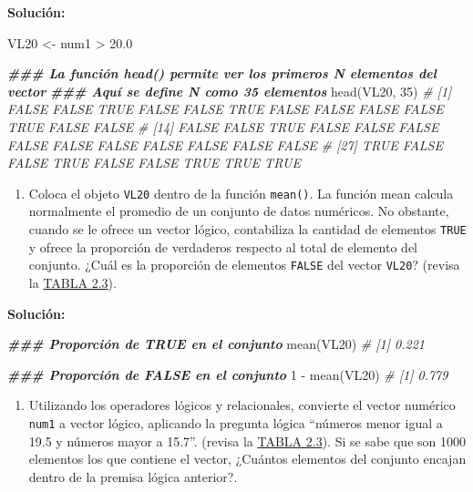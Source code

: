 \documentclass[
]{article}
\newenvironment{Shaded}{\begin{snugshade}}{\end{snugshade}}
\newcommand{\CommentTok}[1]{\textcolor[rgb]{0.56,0.35,0.01}{\textit{#1}}}
\newcommand{\DecValTok}[1]{\textcolor[rgb]{0.00,0.00,0.81}{#1}}
\newcommand{\DocumentationTok}[1]{\textcolor[rgb]{0.56,0.35,0.01}{\textbf{\textit{#1}}}}
\newcommand{\FloatTok}[1]{\textcolor[rgb]{0.00,0.00,0.81}{#1}}
\newcommand{\FunctionTok}[1]{\textcolor[rgb]{0.00,0.00,0.00}{#1}}
\newcommand{\NormalTok}[1]{#1}
\newcommand{\OtherTok}[1]{\textcolor[rgb]{0.56,0.35,0.01}{#1}}
\newcommand{\SpecialCharTok}[1]{\textcolor[rgb]{0.00,0.00,0.00}{#1}}
\providecommand{\tightlist}{%
  \setlength{\itemsep}{0pt}\setlength{\parskip}{0pt}}
\theoremstyle{definition}
\theoremstyle{definition}
\theoremstyle{definition}
\theoremstyle{definition}
\theoremstyle{remark}
\begin{document}
\textbf{Solución:}

\begin{Shaded}
\begin{Highlighting}[]
\NormalTok{VL20 }\OtherTok{\textless{}{-}}\NormalTok{ num1 }\SpecialCharTok{\textgreater{}} \FloatTok{20.0}

\DocumentationTok{\#\#\# La función head() permite ver los primeros N elementos del vector}
\DocumentationTok{\#\#\# Aquí se define N como 35 elementos}
\FunctionTok{head}\NormalTok{(VL20, }\DecValTok{35}\NormalTok{)}
\CommentTok{\#  [1] FALSE FALSE  TRUE FALSE FALSE  TRUE FALSE FALSE FALSE FALSE  TRUE FALSE FALSE}
\CommentTok{\# [14] FALSE FALSE  TRUE FALSE FALSE FALSE FALSE FALSE FALSE FALSE FALSE FALSE FALSE}
\CommentTok{\# [27]  TRUE FALSE FALSE  TRUE FALSE FALSE  TRUE  TRUE  TRUE}
\end{Highlighting}
\end{Shaded}

\begin{enumerate}
\def\labelenumi{\arabic{enumi}.}
\tightlist
\item
  Coloca el objeto \texttt{VL20} dentro de la función \texttt{mean()}. La función mean calcula normalmente el promedio de un conjunto de datos numéricos. No obstante, cuando se le ofrece un vector lógico, contabiliza la cantidad de elementos \texttt{TRUE} y ofrece la proporción de verdaderos respecto al total de elemento del conjunto. ¿Cuál es la proporción de elementos \texttt{FALSE} del vector \texttt{VL20}? (revisa la \protect\hyperlink{operadores-luxf3gicos-y-relacionales}{TABLA 2.3}).
\end{enumerate}

\textbf{Solución:}

\begin{Shaded}
\begin{Highlighting}[]
\DocumentationTok{\#\#\# Proporción de TRUE en el conjunto}
\FunctionTok{mean}\NormalTok{(VL20)}
\CommentTok{\# [1] 0.221}

\DocumentationTok{\#\#\# Proporción de FALSE en el conjunto}
\DecValTok{1} \SpecialCharTok{{-}} \FunctionTok{mean}\NormalTok{(VL20)}
\CommentTok{\# [1] 0.779}
\end{Highlighting}
\end{Shaded}

\begin{enumerate}
\def\labelenumi{\arabic{enumi}.}
\tightlist
\item
  Utilizando los operadores lógicos y relacionales, convierte el vector numérico \texttt{num1} a vector lógico, aplicando la pregunta lógica ``números menor igual a 19.5 y números mayor a 15.7''. (revisa la \protect\hyperlink{operadores-luxf3gicos-y-relacionales}{TABLA 2.3}). Si se sabe que son 1000 elementos los que contiene el vector, ¿Cuántos elementos del conjunto encajan dentro de la premisa lógica anterior?.
\end{enumerate}
\end{document}
